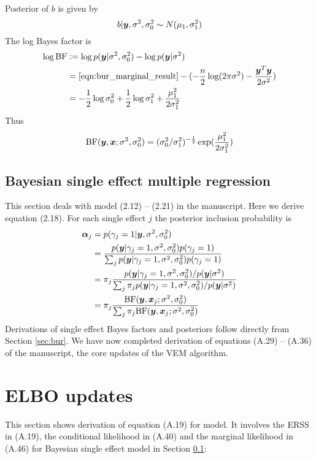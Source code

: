 Posterior of $b$ is given by
\begin{equation}
b | \bm y, \sigma^2, \sigma^2_0 \sim N(\mu_1, \sigma^2_1)
\end{equation}
The log Bayes factor is
\begin{align}
    \log \text{BF} & := \log p(\bm y|\sigma^2, \sigma^2_0) - \log p(\bm y | \sigma^2) \\
    &= \eqref{eqn:bur_marginal_result} - (-\frac{n}{2}\log(2\pi\sigma^2) - \frac{\bm y^T\bm y}{2\sigma^2}) \\
    &= - \frac{1}{2} \log \sigma^2_0 + \frac{1}{2}\log \sigma^2_1 + \frac{\mu_1^2}{2\sigma^2_1}
\end{align}
Thus 
\begin{equation}
\text{BF}(\bm y, \bm x; \sigma^2, \sigma^2_0) = (\sigma^2_0/\sigma^2_1)^{-\frac{1}{2}}\exp(\frac{\mu_1^2}{2\sigma^2_1})
\end{equation}

\subsection{Bayesian single effect multiple regression} \label{sec:bser}

This section deals with model (2.12) -- (2.21) in the manuscript. Here we derive equation (2.18). For each single effect $j$ the posterior inclusion probability is
\begin{align}
    \bm \alpha_j &= p(\gamma_j = 1 | \bm y, \sigma^2, \sigma^2_0) \\
    &= \frac{p(\bm y | \gamma_j = 1, \sigma^2, \sigma^2_0)p(\gamma_j=1)}{\sum_j p(\bm y | \gamma_j = 1, \sigma^2, \sigma^2_0)p(\gamma_j=1)} \\
    &= \pi_j \frac{p(\bm y | \gamma_j = 1, \sigma^2, \sigma^2_0) / p(\bm y|\sigma^2)}{\sum_j \pi_j p(\bm y | \gamma_j = 1, \sigma^2, \sigma^2_0) / p(\bm y | \sigma^2)} \\
    &= \pi_j \frac{\text{BF}(\bm y, \bm x_j; \sigma^2, \sigma^2_0)}{\sum_j \pi_j \text{BF}(\bm y, \bm x_j; \sigma^2, \sigma^2_0)} \label{eqn:ser alpha}
\end{align}
Derivations of single effect Bayes factors and posteriors follow directly from Section \ref{sec:bur}. We have now completed derivation of equations (A.29) -- (A.36) of the manuscript, the core updates of the \susie VEM algorithm.

\section{ELBO updates}

This section shows derivation of equation (A.19) for \susie model. It involves the ERSS in (A.19), the conditional likelihood in (A.40) and the marginal likelihood in (A.46) for Bayesian single effect model in Section \ref{sec:bser}: 

